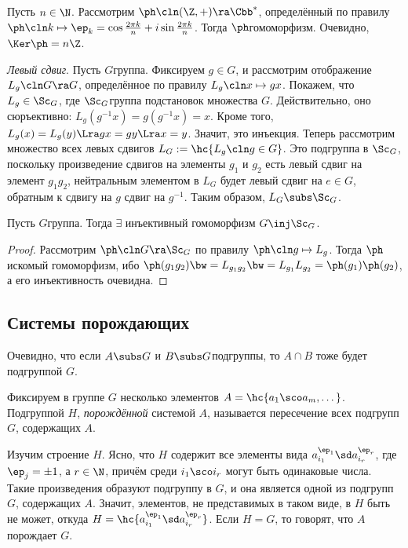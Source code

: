 \documentclass[a4paper]{article}
\newcommand{\kph}{\Ker \ph}
\begin{document}
\begin{ex}

 Пусть $n \in \N$. Рассмотрим $\ph\cln (\Z, +) \ra \Cbb^*$, определённый по правилу $\ph\cln k \mapsto
\ep_k = \cos\frac{2\pi k}{n} + i\sin \frac{2\pi k}{n}$. Тогда $\ph$\т гомоморфизм. Очевидно, $\kph = n\Z$.

 \emph{Левый сдвиг}. Пусть $G$\т группа. Фиксируем $g \in G$, и рассмотрим отображение
$L_g\cln G \ra G$, определённое по правилу $L_g\cln x \mapsto gx$. Покажем, что $L_g \in \Sc_G$, где
$\Sc_G$\т группа подстановок множества $G$. Действительно, оно сюръективно:
$L_g(g^{-1}x)=g(g^{-1}x)=x$. Кроме того, $L_g(x)=L_g(y) \Lra gx=gy \Lra x=y$. Значит, это инъекция.
Теперь рассмотрим множество всех левых сдвигов $L_G := \hc{L_g\cln g \in G}$. Это подгруппа в $\Sc_G$,
поскольку произведение сдвигов на элементы $g_1$ и $g_2$ есть левый сдвиг на элемент $g_1g_2$,
нейтральным элементом в $L_G$ будет левый сдвиг на $e \in G$, обратным к сдвигу на $g$\т
сдвиг на $g^{-1}$. Таким образом, $L_G \subs \Sc_G$.
\end{ex}

\begin{theorem}[Кэли]
Пусть $G$\т группа. Тогда $\exi$ инъективный гомоморфизм $G \inj \Sc_G$.
\end{theorem}
\begin{proof}
Рассмотрим $\ph\cln G \ra \Sc_G$ по правилу $\ph\cln g \mapsto L_g$. Тогда $\ph$\т искомый гомоморфизм, ибо
$\ph(g_1g_2) \bw= L_{g_1g_2} \bw= L_{g_1}L_{g_2}=\ph(g_1)\ph(g_2)$, а его инъективность очевидна.
\end{proof}

\subsection{Системы порождающих}

Очевидно, что если $A \subs G$ и $B \subs G$\т подгруппы, то $A \cap B$ тоже будет подгруппой $G$.

\begin{df}
Фиксируем в группе $G$ несколько элементов $A=\hc{a_1\sco a_m,\dots}$. Подгруппой $H$,
\emph{порождённой} системой $A$, называется пересечение всех подгрупп $G$, содержащих $A$.
\end{df}

Изучим строение $H$. Ясно, что $H$ содержит все элементы вида $a_{i_1}^{\ep_1}\sd a_{i_r}^{\ep_r}$,
где $\ep_j = \pm 1$, а $r \in \N$, причём среди $i_1\sco i_r$ могут быть одинаковые числа. Такие
произведения образуют подгруппу в $G$, и она является одной из подгрупп $G$, содержащих $A$.
Значит, элементов, не представимых в таком виде, в $H$ быть не может, откуда
$H= \hc{a_{i_1}^{\ep_1}\sd a_{i_r}^{\ep_r}}$. Если $H=G$, то говорят, что $A$ порождает $G$.
\end{document}
